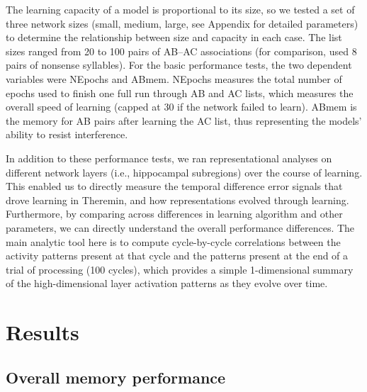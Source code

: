 \documentclass[11pt,twoside]{article}
\newif\myifpdf
\begin{document}
The learning capacity of a model is proportional to its size, so we tested a set of three network sizes (small, medium, large, see Appendix for detailed parameters) to determine the relationship between size and capacity in each case.  The list sizes ranged from 20 to 100 pairs of AB--AC associations (for comparison, \citet{BarnesUnderwood59} used 8 pairs of nonsense syllables).  For the basic performance tests, the two dependent variables were NEpochs and ABmem.  NEpochs measures the total number of epochs used to finish one full run through AB and AC lists, which measures the overall speed of learning (capped at 30 if the network failed to learn). ABmem is the memory for AB pairs after learning the AC list, thus representing the models' ability to resist interference.

In addition to these performance tests, we ran representational analyses on different network layers (i.e., hippocampal subregions) over the course of learning.  This enabled us to directly measure the temporal difference error signals that drove learning in Theremin, and how representations evolved through learning.  Furthermore, by comparing across differences in learning algorithm and other parameters, we can directly understand the overall performance differences.  The main analytic tool here is to compute cycle-by-cycle correlations between the activity patterns present at that cycle and the patterns present at the end of a trial of processing (100 cycles), which provides a simple 1-dimensional summary of the high-dimensional layer activation patterns as they evolve over time.

\section{Results}

\subsection{Overall memory performance}
\end{document}

